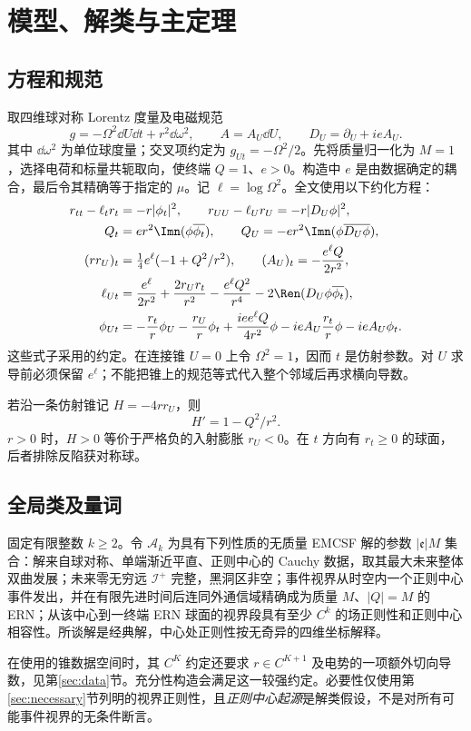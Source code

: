 \section{模型、解类与主定理}\label{sec:main}
\subsection{方程和规范}
取四维球对称 Lorentz 度量及电磁规范
\begin{equation}\label{eq:gauge}
g=-\Omega^2\dd U\dd t+r^2\dd\omega^2,\qquad
A=A_U\dd U,\qquad D_U=\partial_U+ieA_U.
\end{equation}
其中 $\dd\omega^2$ 为单位球度量；交叉项约定为 $g_{Ut}=-\Omega^2/2$。先将质量归一化为 $M=1$，选择电荷和标量共轭取向，使终端 $Q=1$、$e>0$。构造中 $e$ 是由数据确定的耦合，最后令其精确等于指定的 $\mu$。记 $\ell=\log\Omega^2$。全文使用以下约化方程：
\begin{align}
r_{tt}-\ell_t r_t&=-r|\phi_t|^2,\qquad
r_{UU}-\ell_U r_U=-r|D_U\phi|^2,\label{eq:ray}\\
Q_t&=er^2\Imn(\phi\overline{\phi_t}),\qquad
Q_U=-er^2\Imn(\phi\overline{D_U\phi}),\label{eq:maxwell}\\
(rr_U)_t&=\tfrac14e^\ell(-1+Q^2/r^2),\qquad
(A_U)_t=-\frac{e^\ell Q}{2r^2},\label{eq:radius}\\
\ell_{Ut}&=\frac{e^\ell}{2r^2}+\frac{2r_Ur_t}{r^2}
-\frac{e^\ell Q^2}{r^4}-2\Ren(D_U\phi\overline{\phi_t}),\label{eq:lapse}\\
\phi_{Ut}&=-\frac{r_t}{r}\phi_U-\frac{r_U}{r}\phi_t
+\frac{iee^\ell Q}{4r^2}\phi
-ieA_U\frac{r_t}{r}\phi-ieA_U\phi_t.\label{eq:wave}
\end{align}
这些式子采用\cite[§2]{KU}的约定。在连接锥 $U=0$ 上令 $\Omega^2=1$，因而 $t$ 是仿射参数。对 $U$ 求导前必须保留 $e^\ell$；不能把锥上的规范等式代入整个邻域后再求横向导数。

若沿一条仿射锥记 $H=-4rr_U$，则
\begin{equation}\label{eq:H}
H'=1-Q^2/r^2.
\end{equation}
$r>0$ 时，$H>0$ 等价于严格负的入射膨胀 $r_U<0$。在 $t$ 方向有 $r_t\ge0$ 的球面，后者排除反陷获对称球。

\subsection{全局类及量词}
\begin{definition}[正规中心起源的最终极端类]\label{def:class}
固定有限整数 $k\ge2$。令 $\mathscr A_k$ 为具有下列性质的无质量 EMCSF 解的参数 $|\mathfrak e|M$ 集合：解来自球对称、单端渐近平直、正则中心的 Cauchy 数据，取其最大未来整体双曲发展；未来零无穷远 $\mathcal I^+$ 完整，黑洞区非空；事件视界从时空内一个正则中心事件发出，并在有限先进时间后连同外通信域精确成为质量 $M$、$|Q|=M$ 的 ERN；从该中心到一终端 ERN 球面的视界段具有至少 $C^k$ 的场正则性和正则中心相容性。所谈解是经典解，中心处正则性按无奇异的四维坐标解释。
\end{definition}
在使用\cite{KU}的锥数据空间时，其 $C^K$ 约定还要求 $r\in C^{K+1}$ 及电势的一项额外切向导数，见第\ref{sec:data}节。充分性构造会满足这一较强约定。必要性仅使用第\ref{sec:necessary}节列明的视界正则性，且\emph{正则中心起源}是解类假设，不是对所有可能事件视界的无条件断言。

